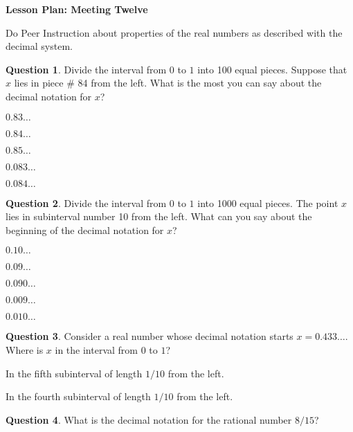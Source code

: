 \documentclass[12pt]{amsart}
\theoremstyle{definition}
\newtheorem{question}{Question}
\begin{document}
\begin{center}
\textbf{\Huge
Lesson Plan: Meeting Twelve
}
\end{center}
\vspace{.5in}

Do Peer Instruction about properties of the real numbers as described with the decimal system.

\begin{question}
Divide the interval from $0$ to $1$ into 100 equal pieces. Suppose that $x$ lies in piece \# 84 from the left. What is the most you can say about the decimal notation for $x$?
\begin{compactitem}
\item $0.83\ldots$
\item $0.84\ldots$
\item $0.85\ldots$
\item $0.083\ldots$
\item $0.084\ldots$
\end{compactitem}
\end{question}

\begin{question}
Divide the interval from $0$ to $1$ into 1000 equal pieces. The point $x$ lies in subinterval number 10 from the left. What can you say about the beginning of the decimal notation for $x$?
\begin{compactitem}
\item $0.10\ldots$
\item $0.09\ldots$
\item $0.090\ldots$
\item $0.009\ldots$
\item $0.010\ldots$
\end{compactitem}
\end{question}

\begin{question}
Consider a real number whose decimal notation starts $x = 0.433\ldots$. Where is $x$ in the interval from $0$ to $1$?
\begin{compactitem}
\item In the fifth subinterval of length $1/10$ from the left.
\item In the fourth subinterval of length $1/10$ from the left.
\end{compactitem}
\end{question}

\begin{question}
What is the decimal notation for the rational number $8/15$?
\end{question}
\end{document}
